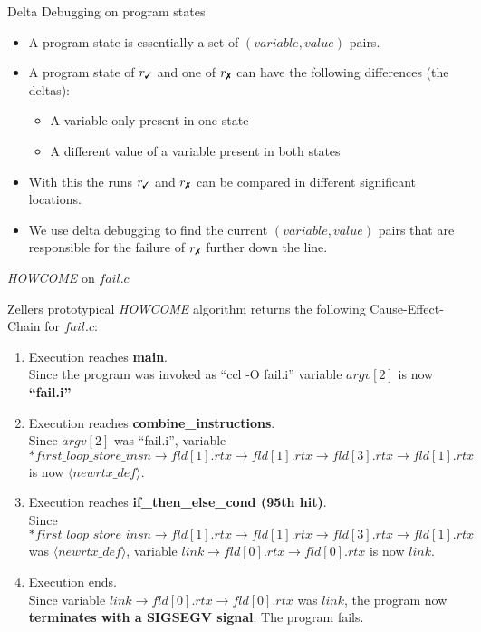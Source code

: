 \begin{frame}{Delta Debugging on program states}
	\begin{itemize}
		\item A program state is essentially a set of $(variable, value)$ pairs.
		\item A program state of $r_\cmark$ and one of $r_\xmark$ can have the following differences (the deltas): \begin{itemize}
			\item A variable only present in one state
			\item A different value of a variable present in both states
		\end{itemize}
		\item With this the runs $r_\cmark$ and $r_\xmark$ can be compared in different significant locations. 
		\item We use delta debugging to find the current $(variable, value)$ pairs that are responsible for the failure of $r_\xmark$ further down the line.
	\end{itemize}


\end{frame}

\newcommand{\cecarrow}{\to}

\begin{frame}{\textit{HOWCOME} on $fail.c$}
	
	Zellers prototypical \textit{HOWCOME} algorithm returns the following Cause-Effect-Chain for $fail.c$:
	\small
	\begin{enumerate}
		\item Execution reaches \textbf{main}. \\Since the program was invoked as ``ccl -O fail.i'' variable \textbf{$argv[2]$} is now \textbf{``fail.i''}
		\item Execution reaches \textbf{combine\_instructions}. \\ Since $argv[2]$ was ``fail.i'', variable \textbf{$*first\_loop\_store\_insn\cecarrow fld[1].rtx \cecarrow fld[1].rtx \cecarrow fld[3].rtx \cecarrow fld[1].rtx$} is now \textbf{$\langle new rtx\_def\rangle$}.
		\item Execution reaches \textbf{if\_then\_else\_cond (95th hit)}. \\ Since $*first\_loop\_store\_insn\cecarrow fld[1].rtx \cecarrow fld[1].rtx \cecarrow fld[3].rtx \cecarrow fld[1].rtx$ was $\langle new rtx\_def\rangle$, variable \textbf{$link \cecarrow fld[0].rtx \cecarrow fld[0].rtx$} is now \textbf{$link$}.
		\item Execution ends. \\ Since variable $link \cecarrow fld[0].rtx \cecarrow fld[0].rtx$ was $link$, the program now \textbf{terminates with a SIGSEGV signal}. The program fails.
	\end{enumerate}
	
\end{frame}